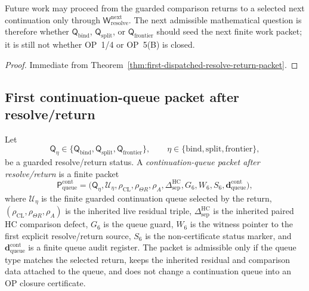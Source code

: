 \begin{corollary}
\label{cor:v3340-r21-working-rule}
Future work may proceed from the guarded comparison returns to a selected next continuation only through \(\mathsf W_{\mathrm{resolve}}^{\mathrm{next}}\). The next admissible mathematical question is therefore whether \(\mathsf Q_{\mathrm{bind}}\), \(\mathsf Q_{\mathrm{split}}\), or \(\mathsf Q_{\mathrm{frontier}}\) should seed the next finite work packet; it is still not whether OP~1/4 or OP~5(B) is closed.
\end{corollary}

\begin{proof}
Immediate from Theorem~\ref{thm:first-dispatched-resolve-return-packet}.
\end{proof}


\subsection{First continuation-queue packet after resolve/return}
\label{subsec:first-continuation-queue-packet-after-resolve-return}

\begin{definition}
\label{def:continuation-queue-packet-after-resolve-return}
Let
\[
 \mathsf Q_{\eta}\in
 \{\mathsf Q_{\mathrm{bind}},\mathsf Q_{\mathrm{split}},\mathsf Q_{\mathrm{frontier}}\},
 \qquad
 \eta\in\{\mathrm{bind},\mathrm{split},\mathrm{frontier}\},
\]
be a guarded resolve/return status. A \emph{continuation-queue packet after resolve/return} is a finite packet
\[
 \mathsf P_{\mathrm{queue}}^{\mathrm{cont}}
 =
 \bigl(
 \mathsf Q_{\eta},
 \mathcal U_{\eta},
 \rho_{\mathrm{CL}},\rho_{\Theta R},\rho_A,
 \Delta_{\mathrm{sep}}^{\mathrm{HC}},
 G_6,W_6,S_6,
 \mathbf d_{\mathrm{queue}}^{\mathrm{cont}}
 \bigr),
\]
where \(\mathcal U_{\eta}\) is the finite guarded continuation queue selected by the return, \((\rho_{\mathrm{CL}},\rho_{\Theta R},\rho_A)\) is the inherited live residual triple, \(\Delta_{\mathrm{sep}}^{\mathrm{HC}}\) is the inherited paired HC comparison defect, \(G_6\) is the queue guard, \(W_6\) is the witness pointer to the first explicit resolve/return source, \(S_6\) is the non-certificate status marker, and \(\mathbf d_{\mathrm{queue}}^{\mathrm{cont}}\) is a finite queue audit register. The packet is admissible only if the queue type matches the selected return, keeps the inherited residual and comparison data attached to the queue, and does not change a continuation queue into an OP closure certificate.
\end{definition}


